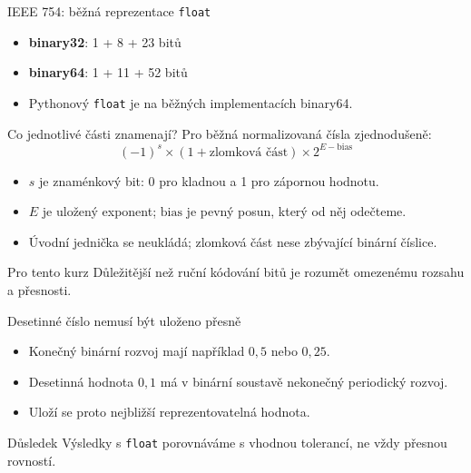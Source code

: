 \documentclass[aspectratio=169]{beamer}
\newcommand{\term}[1]{\textcolor{CodeBlue}{\textbf{#1}}}
\begin{document}
\begin{frame}{IEEE 754: běžná reprezentace \texttt{float}}
  \centering
  \vspace{6mm}
  \begin{itemize}
    \item \term{binary32}: 1 + 8 + 23 bitů
    \item \term{binary64}: 1 + 11 + 52 bitů
    \item Pythonový \texttt{float} je na běžných implementacích binary64.
  \end{itemize}
\end{frame}

\begin{frame}{Co jednotlivé části znamenají?}
  Pro běžná normalizovaná čísla zjednodušeně:
  \[
    (-1)^s \times (1 + \text{zlomková část}) \times 2^{E-\mathrm{bias}}
  \]
  \begin{itemize}
    \item \(s\) je znaménkový bit: 0 pro kladnou a 1 pro zápornou hodnotu.
    \item \(E\) je uložený exponent; \(\mathrm{bias}\) je pevný posun, který od něj odečteme.
    \item Úvodní jednička se neukládá; zlomková část nese zbývající binární číslice.
  \end{itemize}
  \begin{alertblock}{Pro tento kurz}
    Důležitější než ruční kódování bitů je rozumět omezenému rozsahu a přesnosti.
  \end{alertblock}
\end{frame}

\begin{frame}{Desetinné číslo nemusí být uloženo přesně}
  \begin{itemize}
    \item Konečný binární rozvoj mají například $0{,}5$ nebo $0{,}25$.
    \item Desetinná hodnota $0{,}1$ má v binární soustavě nekonečný periodický rozvoj.
    \item Uloží se proto nejbližší reprezentovatelná hodnota.
  \end{itemize}
  \begin{block}{Důsledek}
    Výsledky s \texttt{float} porovnáváme s vhodnou tolerancí, ne vždy přesnou rovností.
  \end{block}
\end{frame}
\end{document}
